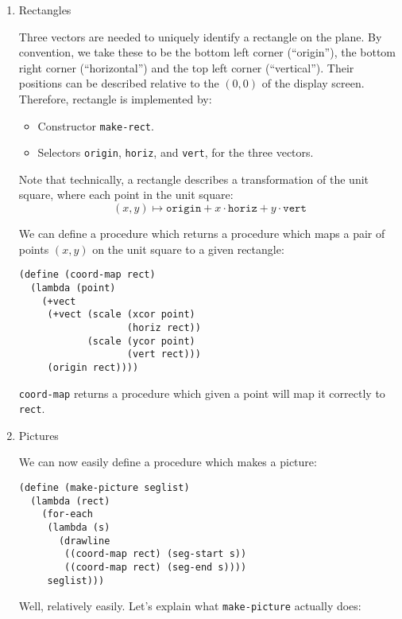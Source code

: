 \documentclass[9pt]{report}
\begin{document}
\begin{enumerate}
\item Rectangles
\label{sec:org5715e62}

Three vectors are needed to uniquely identify a rectangle on the
plane. By convention, we take these to be the bottom left corner
(``origin''), the bottom right corner (``horizontal'') and the top
left corner (``vertical''). Their positions can be described
relative to the \((0,0)\) of the display screen. Therefore,
rectangle is implemented by:
\begin{itemize}
\item Constructor \texttt{make-rect}.
\item Selectors \texttt{origin}, \texttt{horiz}, and \texttt{vert}, for the three vectors.
\end{itemize}

Note that technically, a rectangle describes a transformation of
the unit square, where each point in the unit square:
$$(x,y)\mapsto \mathtt{origin} + x\cdot \mathtt{horiz} + y\cdot
     \mathtt{vert}$$

We can define a procedure which returns a procedure which maps
a pair of points \((x,y)\) on the unit square to a given rectangle:

\begin{verbatim}
(define (coord-map rect)
  (lambda (point)
    (+vect
     (+vect (scale (xcor point)
                   (horiz rect))
            (scale (ycor point)
                   (vert rect)))
     (origin rect))))
\end{verbatim}

\texttt{coord-map} returns a procedure which given a point will map it
correctly to \texttt{rect}.

\item Pictures
\label{sec:org8b3637e}

We can now easily define a procedure which makes a picture:
\begin{verbatim}
(define (make-picture seglist)
  (lambda (rect)
    (for-each
     (lambda (s)
       (drawline
        ((coord-map rect) (seg-start s))
        ((coord-map rect) (seg-end s))))
     seglist)))
\end{verbatim}

Well, relatively easily. Let's explain what \texttt{make-picture}
actually does:


\end{enumerate}
\end{document}
